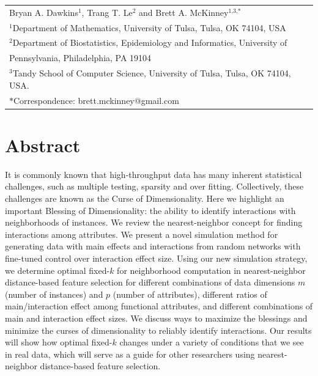 \documentclass[10pt,letterpaper]{article}\usepackage[]{graphicx}\usepackage[]{color}
\begin{document}
\vspace*{0.2in}

{\Large
\textbf{} %
}
\begin{center}
  \begin{tabular}{l}
  Bryan A. Dawkins$^{\text{1}}$, Trang T. Le$^{\text{2}}$ and Brett A. McKinney$^{\text{1,3,}*}$ \\
  $^{\text{1}}$Department of Mathematics, University of Tulsa, Tulsa, OK 74104, USA \\
  $^{\text{2}}$Department of Biostatistics, Epidemiology and Informatics, University of \\
  \hphantom{2}Pennsylvania, Philadelphia, PA 19104 \\
  $^{\text{3}}$Tandy School of Computer Science, University of Tulsa, Tulsa, OK 74104, USA. \\
  $*$Correspondence: brett.mckinney@gmail.com
  \end{tabular}
\end{center}


\section*{Abstract}
It is commonly known that high-throughput data has many inherent statistical challenges, such as multiple testing, sparsity and over fitting. Collectively, these challenges are known as the Curse of Dimensionality. Here we highlight an important Blessing of Dimensionality: the ability to identify interactions with neighborhoods of instances. We review the nearest-neighbor concept for finding interactions among attributes. We present a novel simulation method for generating data with main effects and interactions from random networks with fine-tuned control over interaction effect size. Using our new simulation strategy, we determine optimal fixed-$k$ for neighborhood computation in nearest-neighbor distance-based feature selection for different combinations of data dimensions $m$ (number of instances) and $p$ (number of attributes), different ratios of main/interaction effect among functional attributes, and different combinations of main and interaction effect sizes. We discuss ways to maximize the blessings and minimize the curses of dimensionality to reliably identify interactions. Our results will show how optimal fixed-$k$ changes under a variety of conditions that we see in real data, which will serve as a guide for other researchers using nearest-neighbor distance-based feature selection. 
\end{document}
